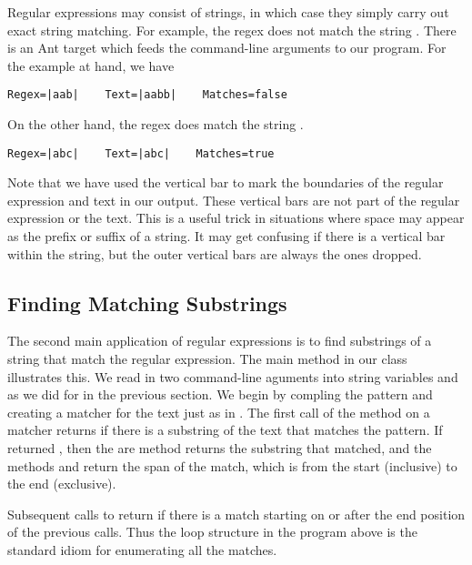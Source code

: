 Regular expressions may consist of strings, in which case they
simply carry out exact string matching.  For example, the regex
 does not match the string .  
There is an Ant target  which feeds the command-line
arguments to our program.  For the example at hand, we have
%
\begin{verbatim}
Regex=|aab|    Text=|aabb|    Matches=false
\end{verbatim}
%
On the other hand, the regex  does match
the string .
%
\begin{verbatim}
Regex=|abc|    Text=|abc|    Matches=true
\end{verbatim}
%
Note that we have used the vertical bar to mark the boundaries of the
regular expression and text in our output.  These vertical bars are
not part of the regular expression or the text.  This is a useful
trick in situations where space may appear as the prefix or suffix of
a string.  It may get confusing if there is a vertical bar within the
string, but the outer vertical bars are always the ones dropped.

\subsection{Finding Matching Substrings}

The second main application of regular expressions is to find
substrings of a string that match the regular expression.  The main
method in our class  illustrates this.  We read in two
command-line aguments into string variables  and 
as we did for  in the previous section.  We begin
by compling the pattern and creating a matcher for the text just
as in .
%
%
The first call of the  method on a matcher returns
 if there is a substring of the text that matches the
pattern.  If  returned , then the are method
 returns the substring that matched, and the methods
 and  return the span of the match, which is
from the start (inclusive) to the end (exclusive).

Subsequent calls to  return  if there is a
match starting on or after the end position of the previous calls.
Thus the loop structure in the program above is the standard idiom
for enumerating all the matches.  

